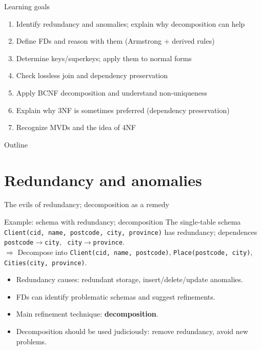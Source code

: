 \documentclass[10pt,aspectratio=169]{beamer}
\newenvironment{examplebox}[1][Example]{\begin{exampleblock}{#1}}{\end{exampleblock}}
\begin{document}
\begin{frame}{Learning goals}
\begin{enumerate}
  \item Identify redundancy and anomalies; explain why decomposition can help
  \item Define FDs and reason with them (Armstrong + derived rules)
  \item Determine keys/superkeys; apply them to normal forms
  \item Check lossless join and dependency preservation
  \item Apply BCNF decomposition and understand non-uniqueness
  \item Explain why 3NF is sometimes preferred (dependency preservation)
  \item Recognize MVDs and the idea of 4NF
\end{enumerate}
\end{frame}

\begin{frame}{Outline}
\tableofcontents
\end{frame}

\section{Redundancy and anomalies}

\begin{frame}{The evils of redundancy; decomposition as a remedy}
\begin{examplebox}[Example: schema with redundancy; decomposition]
The single-table schema \texttt{Client(cid, name, postcode, city, province)} has redundancy; dependences\\
\texttt{postcode}$\rightarrow$\texttt{city}, \ \texttt{city}$\rightarrow$\texttt{province}.\\[0.2em]
\(\Rightarrow\) Decompose into \texttt{Client(cid, name, postcode)}, \texttt{Place(postcode, city)}, \texttt{Cities(city, province)}.
\end{examplebox}

\begin{itemize}
  \item Redundancy causes: redundant storage, insert/delete/update anomalies.
  \item FDs can identify problematic schemas and suggest refinements.
  \item Main refinement technique: \textbf{decomposition}.
  \item Decomposition should be used judiciously: remove redundancy, avoid new problems.
\end{itemize}
\end{frame}
\end{document}
